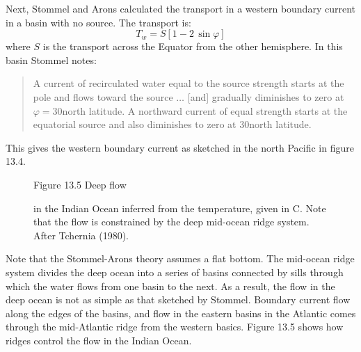 Next, Stommel and Arons calculated the
transport in a
western boundary current in a basin with no source. The transport is:
\begin{equation}
T_w = S \left[ 1 - 2 \, \sin \varphi \right]
\end{equation}
where $S$ is the transport across the
Equator from the other hemisphere. In this basin Stommel notes:
\begin{quote} \small
A current of recirculated water equal to the source strength starts at
the pole and flows toward the source $\ldots$ [and] gradually
diminishes to zero at $\varphi = 30$\degrees north latitude. A
northward current of equal strength starts at the equatorial source
and also diminishes to zero at 30\degrees north latitude.
\end{quote}
This gives the western boundary current as sketched in the north
Pacific in figure 13.4.

\begin{figure}[t!]
\centering
{}
\footnotesize
Figure 13.5 Deep flow\rule{0mm}{3ex} in the Indian Ocean inferred from
the temperature, given in \degrees C. Note that the flow is
constrained by the deep mid-ocean ridge system.  After Tchernia
(1980).
\label{fig:deepindian}
\vspace{-3ex}
\end{figure}

Note that the Stommel-Arons theory assumes a flat bottom. The
mid-ocean ridge system divides the deep ocean into a series of basins
connected by sills through which the water flows from one basin to the
next. As a result, the flow in the deep ocean is not as simple as that
sketched by Stommel. Boundary current flow along the edges of the
basins, and flow in the eastern basins in the Atlantic comes through
the mid-Atlantic ridge from the western basics. Figure 13.5 shows how
ridges control the flow in the Indian Ocean.


